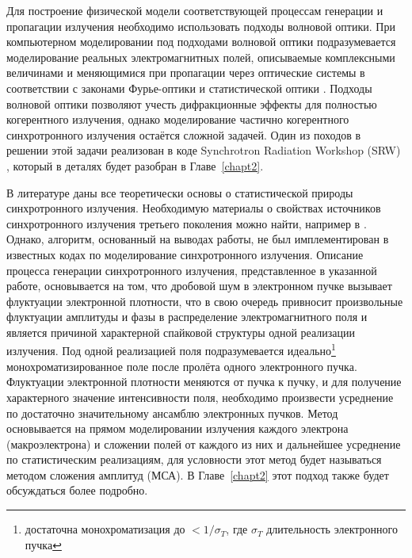 Для построение физической модели соответствующей процессам генерации и пропагации излучения необходимо использовать подходы волновой оптики. При компьютерном моделировании под подходами волновой оптики подразумевается моделирование реальных электромагнитных полей, описываемые комплексными величинами и меняющимися при пропагации через оптические системы в соответствии с законами Фурье-оптики \cite{goodman_introduction_2005} и статистической оптики \cite{goodman_statistical_2015}. Подходы волновой оптики позволяют учесть дифракционные эффекты для полностью когерентного излучения, однако моделирование частично когерентного синхротронного излучения остаётся сложной задачей. Один из походов в решении этой задачи реализован в коде Synchrotron Radiation Workshop (SRW) \cite{chubar_accurate_1998}, который в деталях будет разобран в Главе~\ref{chapt2}.

В литературе даны все теоретически основы о статистической природы синхротронного излучения. Необходимую материалы о свойствах источников синхротронного излучения третьего поколения можно найти, например в \cite{geloni_transverse_2008}. Однако, алгоритм, основанный на выводах работы, не был имплементирован в известных кодах по моделирование синхротронного излучения. Описание процесса генерации синхротронного излучения, представленное в указанной работе, основывается на том, что дробовой шум в электронном пучке вызывает флуктуации электронной плотности, что в свою очередь привносит произвольные флуктуации амплитуды и фазы в распределение электромагнитного поля и является причиной характерной спайковой структуры одной реализации излучения. Под одной реализацией поля подразумевается идеально\footnote{достаточна монохроматизация до $ < 1/\sigma_{T}$, где $\sigma_{T}$ длительность электронного пучка} монохроматизированное поле после пролёта одного электронного пучка. Флуктуации электронной плотности меняются от пучка к пучку, и для получение характерного значение интенсивности поля, необходимо произвести усреднение по достаточно значительному ансамблю электронных пучков. Метод основывается на прямом моделировании излучения каждого электрона (макроэлектрона) и сложении полей от каждого из них и дальнейшее усреднение по статистическим реализациям, для условности этот метод будет называться методом сложения амплитуд (МСА). В Главе~\ref{chapt2} этот подход также будет обсуждаться более подробно.

